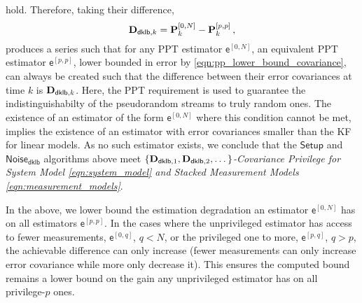 \documentclass[conference]{IEEEtran}
\theoremstyle{definition}
\theoremstyle{remark}
\begin{document}
hold. Therefore, taking their difference,
\begin{equation}\label{eqn:unpriv_priv_dklb_difference_series}
  \mat{D}_{\mathsf{dklb},k} = \mat{P}_k^{[0,N]} - \mat{P}_k^{[p,p]}\,,
\end{equation}
produces a series such that for any PPT estimator $\mathsf{e}^{[0,N]}$, an equivalent PPT estimator $\mathsf{e}^{[p,p]}$, lower bounded in error by \eqref{eqn:pp_lower_bound_covariance}, can always be created such that the difference between their error covariances at time $k$ is ${{\mathbf{D}}}_{\mathsf{dklb},k}$. Here, the PPT requirement is used to guarantee the indistinguishabilty of the pseudorandom streams to truly random ones. The existence of an estimator of the form $\mathsf{e}^{[0,N]}$ where this condition cannot be met, implies the existence of an estimator with error covariances smaller than the KF for linear models. As no such estimator exists, we conclude that the $\mathsf{Setup}$ and $\mathsf{Noise_{\mathsf{dklb}}}$ algorithms above meet \textit{$\{{{\mathbf{D}}}_{\mathsf{dklb},1},{{\mathbf{D}}}_{\mathsf{dklb},2},\dots\}$-Covariance Privilege for System Model \eqref{eqn:system_model} and Stacked Measurement Models \eqref{eqn:measurement_models}}.

In the above, we lower bound the estimation degradation an estimator $\mathsf{e}^{[0,N]}$ has on all estimators $\mathsf{e}^{[p,p]}$. In the cases where the unprivileged estimator has access to fewer measurements, $\mathsf{e}^{[0,q]}$, $q<N$, or the privileged one to more, $\mathsf{e}^{[p,q]}$, $q>p$, the achievable difference can only increase (fewer measurements can only increase error covariance while more only decrease it). This ensures the computed bound remains a lower bound on the gain any unprivileged estimator has on all privilege-$p$ ones.

% 
% 
\end{document}
